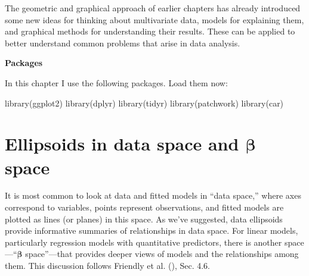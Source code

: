 \documentclass[
  letterpaper,
  10pt,
  krantz2]{krantz}
\makeatletter
\newenvironment{Shaded}{\begin{snugshade}}{\end{snugshade}}
\newcommand{\FunctionTok}[1]{\textcolor[rgb]{0.28,0.35,0.67}{#1}}
\newcommand{\NormalTok}[1]{\textcolor[rgb]{0.00,0.23,0.31}{#1}}
\newenvironment{kframe}{%
  \medskip{}
  \setlength{\fboxsep}{.8em}
  \def\at@end@of@kframe{}%
  \ifinner\ifhmode%
  \def\at@end@of@kframe{\end{minipage}}%
  \begin{minipage}{\columnwidth}%
  \fi\fi%
  \def\FrameCommand##1{\hskip\@totalleftmargin \hskip-\fboxsep
  \colorbox{shadecolor}{##1}\hskip-\fboxsep
      \hskip-\linewidth \hskip-\@totalleftmargin \hskip\columnwidth}%
  \MakeFramed {\advance\hsize-\width
    \@totalleftmargin\z@ \linewidth\hsize
    \@setminipage}}%
{\par\unskip\endMakeFramed%
  \at@end@of@kframe}
\renewenvironment{Shaded}{\begin{kframe}}{\end{kframe}}
\makeatother
\begin{document}
\newcommand{\sizedmat}[2]{\mathord{\mathop{\mat{#1}}\limits_{#2}}}

\renewcommand*{\H}{\mathbf{H}}               
\newcommand*{\E}{\mathbf{E}}
\newcommand*{\widebar}[1]{\overline{#1}}

\newcommand{\Var}{\mathsf{Var}}
\newcommand{\Cov}{\mathsf{Cov}}
\newcommand{\HO}{\mathcal{H}_0}

\newcommand*{\V}{\mathcal{V}}

\newcommand{\pkg}[1]{\textsf{#1}}
\newcommand{\Rpackage}[1]{\pkg{#1} package}

The geometric and graphical approach of earlier chapters has already
introduced some new ideas for thinking about multivariate data, models
for explaining them, and graphical methods for understanding their
results. These can be applied to better understand common problems that
arise in data analysis.

\textbf{Packages}

In this chapter I use the following packages. Load them now:

\begin{Shaded}
\begin{Highlighting}[]
\FunctionTok{library}\NormalTok{(ggplot2)}
\FunctionTok{library}\NormalTok{(dplyr)}
\FunctionTok{library}\NormalTok{(tidyr)}
\FunctionTok{library}\NormalTok{(patchwork)}
\FunctionTok{library}\NormalTok{(car)}
\end{Highlighting}
\end{Shaded}

\section{\texorpdfstring{Ellipsoids in data space and \(\mathbf{\beta}\)
space}{Ellipsoids in data space and \textbackslash mathbf\{\textbackslash beta\} space}}\label{sec:betaspace}

It is most common to look at data and fitted models in ``data space,''
where axes correspond to variables, points represent observations, and
fitted models are plotted as lines (or planes) in this space. As we've
suggested, data ellipsoids provide informative summaries of
relationships in data space. For linear models, particularly regression
models with quantitative predictors, there is another
space---``\(\mathbf{\beta}\) space''---that provides deeper views of
models and the relationships among them. This discussion follows
Friendly et al. (), Sec.
4.6.
\end{document}
